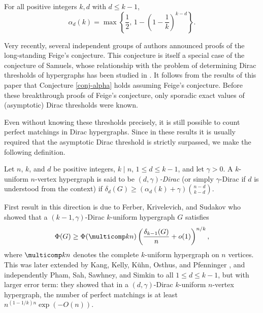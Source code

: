 \documentclass[11pt]{article}
\begin{document}

\begin{conjecture}\label{conj-alpha}
    For all positive integers $k,d$ with $d\le k-1$,
    $$\alpha_d(k)=\max\left\{\frac{1}{2},\,1-\left(1-\frac{1}{k}\right)^{k-d}\right\}.$$
\end{conjecture}

Very recently, several independent groups of authors \cite{fu2026sharp,nie2026feige,stander2026conditional} announced proofs of the long-\linebreak standing Feige's conjecture. This conjecture is itself a special case of the conjecture of Samuels, whose relationship with the problem of determining Dirac thresholds of hypergraphs has been studied in \cite{alon2012large}. It follows from the results of this paper that Conjecture \ref{conj-alpha} holds assuming Feige's conjecture. Before these breakthrough proofs of Feige's conjecture, only sporadic exact values of (asymptotic) Dirac thresholds were known.

Even without knowing these thresholds precisely, it is still possible to count perfect matchings in Dirac hypergraphs. Since in these results it is usually required that the asymptotic Dirac threshold is strictly surpassed, we make the following definition.

\begin{definition}\label{def-gamma-dirac}
    Let $n$, $k$, and $d$ be positive integers, $k\mid n$, $1\le d\le k-1$, and let $\gamma>0$. A $k$-uniform $n$-vertex hypergraph is said to be \emph{$(d,\gamma)$-Dirac} (or simply $\gamma$-Dirac if $d$ is understood from the context) if $\delta_d(G)\ge(\alpha_d(k)+\gamma)\binom{n-d}{k-d}$.
\end{definition}

First result in this direction is due to Ferber, Krivelevich, and Sudakov \cite{ferber2014counting} who showed that a $(k-1,\gamma)$-Dirac $k$-uniform hypergraph $G$ satisfies
$$\Phi(G)\ge \Phi(\multicomp kn)\left(\frac{\delta_{k-1}(G)}{n}+o(1)\right)^{n/k},$$
where $\multicomp kn$ denotes the complete $k$-uniform hypergraph on $n$ vertices. This was later extended by Kang, Kelly, K\"uhn, Osthus, and Pfenninger \cite{kang2024perfect}, and independently Pham, Sah, Sawhney, and Simkin \cite{pham2022toolkit} to all $1\le d\le k-1$, but with larger error term: they showed that in a $(d,\gamma)$-Dirac $k$-uniform $n$-vertex hypergraph, the number of perfect matchings is at least $n^{(1-1/k)n}\exp(-O(n))$.
\end{document}
